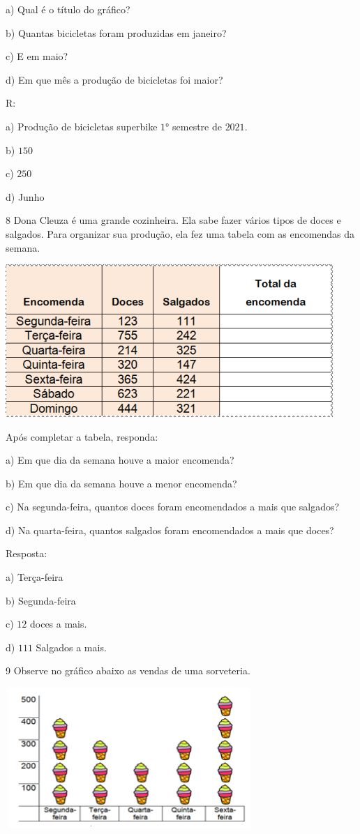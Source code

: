 a) Qual é o título do gráfico?

b) Quantas bicicletas foram produzidas em janeiro?

c) E em maio?

d) Em que mês a produção de bicicletas foi maior?

R:

a) Produção de bicicletas superbike $1$° semestre de $2021$.

b) $150$

c) $250$

d) Junho

\num{8}  Dona Cleuza é uma grande cozinheira. Ela sabe fazer vários tipos de
doces e salgados. Para organizar sua produção, ela fez uma tabela com as
encomendas da semana.

\includegraphics[width=4.88403in,height=2.27917in]{./imgSAEB_6_MAT/media/image86.png}

Após completar a tabela, responda:

a) Em que dia da semana houve a maior encomenda?

b) Em que dia da semana houve a menor encomenda?

c) Na segunda-feira, quantos doces foram encomendados a mais que
salgados?

d) Na quarta-feira, quantos salgados foram encomendados a mais que
doces?

Resposta:

a) Terça-feira

b) Segunda-feira

c) $12$ doces a mais.

d) $111$ Salgados a mais.

\num{9}  Observe no gráfico abaixo as vendas de uma sorveteria.

\includegraphics[width=3.7in,height=2.1in]{./imgSAEB_6_MAT/media/image87.png}

